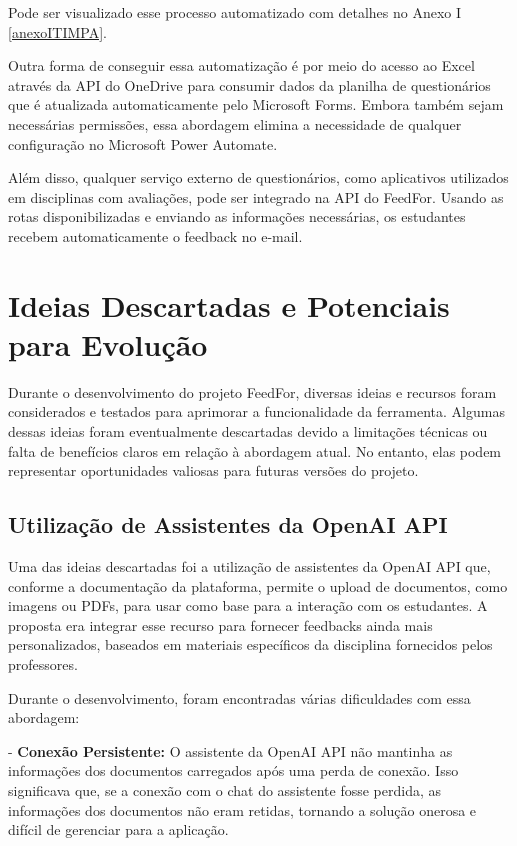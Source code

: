 Pode ser visualizado esse processo automatizado com detalhes no Anexo I \ref{anexoITIMPA}.

Outra forma de conseguir essa automatização é por meio do acesso ao Excel através da API do OneDrive para consumir dados da planilha de questionários que é atualizada automaticamente pelo Microsoft Forms. Embora também sejam necessárias permissões, essa abordagem elimina a necessidade de qualquer configuração no Microsoft Power Automate.

Além disso, qualquer serviço externo de questionários, como aplicativos utilizados em disciplinas com avaliações, pode ser integrado na API do FeedFor. Usando as rotas disponibilizadas e enviando as informações necessárias, os estudantes recebem automaticamente o feedback no e-mail.

\section{Ideias Descartadas e Potenciais para Evolução}

Durante o desenvolvimento do projeto FeedFor, diversas ideias e recursos foram considerados e testados para aprimorar a funcionalidade da ferramenta. Algumas dessas ideias foram eventualmente descartadas devido a limitações técnicas ou falta de benefícios claros em relação à abordagem atual. No entanto, elas podem representar oportunidades valiosas para futuras versões do projeto.

\subsection{Utilização de Assistentes da OpenAI API}

Uma das ideias descartadas foi a utilização de assistentes da OpenAI API que, conforme a documentação da plataforma, permite o upload de documentos, como imagens ou PDFs, para usar como base para a interação com os estudantes. A proposta era integrar esse recurso para fornecer feedbacks ainda mais personalizados, baseados em materiais específicos da disciplina fornecidos pelos professores.

Durante o desenvolvimento, foram encontradas várias dificuldades com essa abordagem:

- \textbf{Conexão Persistente:} O assistente da OpenAI API não mantinha as informações dos documentos carregados após uma perda de conexão. Isso significava que, se a conexão com o chat do assistente fosse perdida, as informações dos documentos não eram retidas, tornando a solução onerosa e difícil de gerenciar para a aplicação.

